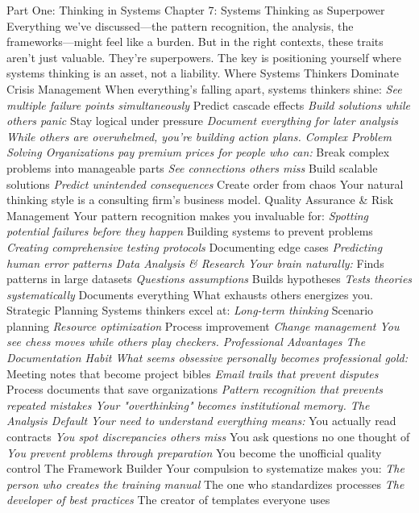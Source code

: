 \documentclass[12pt]{book}
\begin{document}
Part One: Thinking in Systems
Chapter 7: Systems Thinking as Superpower
Everything we've discussed—the pattern recognition, the analysis, the frameworks—might feel like a burden. But in the right contexts, these traits aren't just valuable. They're superpowers.
The key is positioning yourself where systems thinking is an asset, not a liability.
Where Systems Thinkers Dominate
Crisis Management When everything's falling apart, systems thinkers shine:
\textit{ See multiple failure points simultaneously
} Predict cascade effects
\textit{ Build solutions while others panic
} Stay logical under pressure
\textit{ Document everything for later analysis
While others are overwhelmed, you're building action plans.
Complex Problem Solving Organizations pay premium prices for people who can:
} Break complex problems into manageable parts
\textit{ See connections others miss
} Build scalable solutions
\textit{ Predict unintended consequences
} Create order from chaos
Your natural thinking style is a consulting firm's business model.
Quality Assurance \& Risk Management Your pattern recognition makes you invaluable for:
\textit{ Spotting potential failures before they happen
} Building systems to prevent problems
\textit{ Creating comprehensive testing protocols
} Documenting edge cases
\textit{ Predicting human error patterns
Data Analysis \& Research Your brain naturally:
} Finds patterns in large datasets
\textit{ Questions assumptions
} Builds hypotheses
\textit{ Tests theories systematically
} Documents everything
What exhausts others energizes you.
Strategic Planning Systems thinkers excel at:
\textit{ Long-term thinking
} Scenario planning
\textit{ Resource optimization
} Process improvement
\textit{ Change management
You see chess moves while others play checkers.
Professional Advantages
The Documentation Habit What seems obsessive personally becomes professional gold:
} Meeting notes that become project bibles
\textit{ Email trails that prevent disputes
} Process documents that save organizations
\textit{ Pattern recognition that prevents repeated mistakes
Your "overthinking" becomes institutional memory.
The Analysis Default Your need to understand everything means:
} You actually read contracts
\textit{ You spot discrepancies others miss
} You ask questions no one thought of
\textit{ You prevent problems through preparation
} You become the unofficial quality control
The Framework Builder Your compulsion to systematize makes you:
\textit{ The person who creates the training manual
} The one who standardizes processes
\textit{ The developer of best practices
} The creator of templates everyone uses
\end{document}
